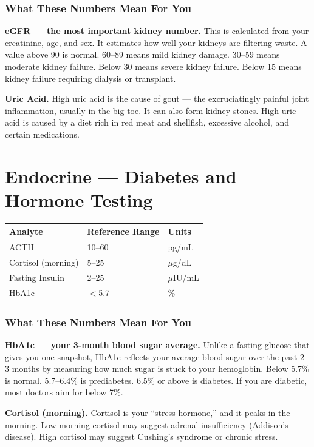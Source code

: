 \subsubsection{What These Numbers Mean For You}

\textbf{eGFR --- the most important kidney number.} This is calculated from your creatinine, age, and sex. It estimates how well your kidneys are filtering waste. A value above 90 is normal. 60--89 means mild kidney damage. 30--59 means moderate kidney failure. Below 30 means severe kidney failure. Below 15 means kidney failure requiring dialysis or transplant.

\textbf{Uric Acid.} High uric acid is the cause of gout --- the excruciatingly painful joint inflammation, usually in the big toe. It can also form kidney stones. High uric acid is caused by a diet rich in red meat and shellfish, excessive alcohol, and certain medications.

\clearpage
\section{Endocrine --- Diabetes and Hormone Testing}

\begin{longtable}{@{}lll@{}}
\toprule
\textbf{Analyte} & \textbf{Reference Range} & \textbf{Units} \\
\midrule
ACTH & 10--60 & pg/mL \\
Cortisol (morning) & 5--25 & $\mu$g/dL \\
Fasting Insulin & 2--25 & $\mu$IU/mL \\
HbA1c & $<$5.7 & \% \\
\bottomrule
\end{longtable}

\subsubsection{What These Numbers Mean For You}

\textbf{HbA1c --- your 3-month blood sugar average.} Unlike a fasting glucose that gives you one snapshot, HbA1c reflects your average blood sugar over the past 2--3 months by measuring how much sugar is stuck to your hemoglobin. Below 5.7\% is normal. 5.7--6.4\% is prediabetes. 6.5\% or above is diabetes. If you are diabetic, most doctors aim for below 7\%.

\textbf{Cortisol (morning).} Cortisol is your ``stress hormone,'' and it peaks in the morning. Low morning cortisol may suggest adrenal insufficiency (Addison's disease). High cortisol may suggest Cushing's syndrome or chronic stress.

